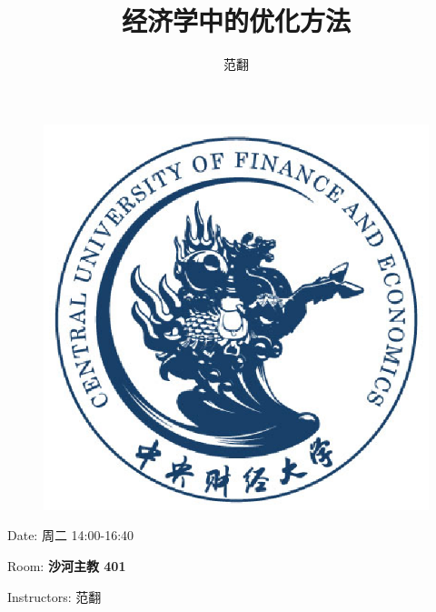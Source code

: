 \documentclass{beamer}
\title{经济学中的优化方法}
\subtitle{}
\author{范翻}
\institute{中央财经大学(CCFD)}
\date{}
\begin{document}
\kaishu  %
\begin{frame}
  \titlepage
  \begin{figure}[htpb]
    \centering
    \includegraphics[width=0.2\linewidth]{pic/cufe_logo_blue.eps}
  \end{figure}
\end{frame}



\begin{frame}
Date: 周二 14:00-16:40

Room: \textbf{沙河主教 401}

Instructors: 范翻
\end{frame}
\end{document}
